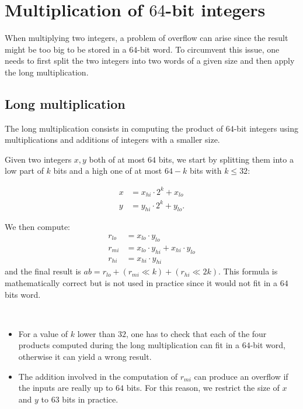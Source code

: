 \documentclass[a4paper]{article}
\begin{document}
\section{Multiplication of $64$-bit integers} 

When multiplying two integers, a problem of overflow can arise since the result might be too big to be stored in a $64$-bit word. 
To circumvent this issue, one needs to first split the two integers into two words of a given size and then apply the long multiplication.

\subsection{Long multiplication} \label{mulsplit}

The long multiplication consists in computing the product of $64$-bit integers using multiplications and additions of
integers with a smaller size.

\bigskip
Given two integers $x,y$ both of at most $64$ bits, we start by splitting them into a low part of $k$ bits
and a high one of at most $64-k$ bits with $k\leq32$:

\begin{align*}
    x &= x_{hi}\cdot 2^{k} + x_{lo} \\
    y &= y_{hi}\cdot 2^{k} + y_{lo}.
\end{align*}

\bigskip
We then compute:
\begin{align*}
    r_{lo} &= x_{lo}\cdot y_{lo} \\
    r_{mi} &= x_{lo}\cdot y_{hi} + x_{hi}\cdot y_{lo} \\
    r_{hi} &= x_{hi}\cdot y_{hi}
\end{align*}
and the final result is $ab = r_{lo} + (r_{mi} \ll k) + (r_{hi} \ll 2k)$. 
This formula is mathematically correct but is not used in practice since it would not fit in a $64$ bits word. 

\begin{remark}
    \
    \begin{itemize}
        \item For a value of $k$ lower than $32$, one has to check that each of the four products computed during the long multiplication can fit in a
        $64$-bit word, otherwise it can yield a wrong result.
        \item The addition involved in the computation of $r_{mi}$ can produce an overflow if the inputs are really up to $64$ bits.
        For this reason, we restrict the size of $x$ and $y$ to $63$ bits in practice. 
    \end{itemize}
\end{remark}
\end{document}
